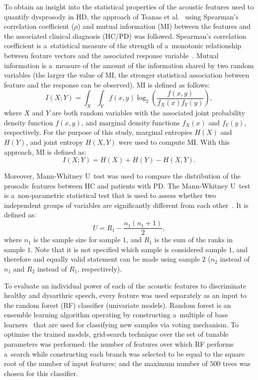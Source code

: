 To obtain an insight into the statistical properties of the acoustic features used to quantify dysprosody in HD, the approach of Tsanas et al.~\cite{Tsanas2010} using Spearman's correlation coefficient ($\rho$) and mutual information (MI) between the features and the associated clinical diagnosis (HC/PD) was followed. Spearman's correlation coefficient is a~statistical measure of the strength of a~monotonic relationship between feature vectors and the associated response variable~\cite{Sheskin2007}. Mutual information is a~measure of the amount of the information shared by two random variables (the larger the value of MI, the stronger statistical association between feature and the response can be observed). MI is defined as follows:
\begin{equation}
	I(X; Y) = \int_X\int_Y f(x, y) \log_2 \left(\frac{f(x, y)}{f_X(x)f_Y(y)} \right),
\end{equation}
where $X$ and $Y$ are both random variables with the associated joint probability density function $f(x, y)$, and marginal density functions $f_X(x)$ and $f_Y(y)$, respectively. For the purpose of this study, marginal entropies $H(X)$ and $H(Y)$, and joint entropy $H(X,Y)$ were used to compute MI. With this approach, MI is defined as:
\begin{equation}
	I(X; Y) = H(X) + H(Y) - H(X, Y).
\end{equation}

Moreover, Mann-Whitney U~test was used to compare the distribution of the prosodic features between HC and patients with PD. The Mann-Whitney U~test is a~non-parametric statistical test that is used to assess whether two independent groups of variables are significantly different from each other~\cite{Birnbaum1956}. It is defined as:
\begin{equation}
	U = R_1 - \frac{n_1 (n_1 + 1)}{2},
\end{equation}
where $n_1$ is the sample size for sample $1$, and $R_1$ is the sum of the ranks in sample $1$. Note that it is not specified which sample is considered sample $1$, and therefore and equally valid statement can be made using sample $2$ ($n_2$ instead of $n_1$ and $R_2$ instead of $R_1$, respectively).

To evaluate an individual power of each of the acoustic features to discriminate healthy and dysarthric speech, every feature was used separately as an input to the random forest (RF) classifier (univariate models). Random forest is an ensemble learning algorithm operating by constructing a~multiple of base learners~\cite{Breiman2001} that are used for classifying new samples via voting mechanism. To optimise the trained models, grid-search technique over the set of tunable parameters was performed: the number of features over which RF performs a~search while constructing each branch was selected to be equal to the square root of the number of input features; and the maximum number of $500$ trees was chosen for this classifier.

